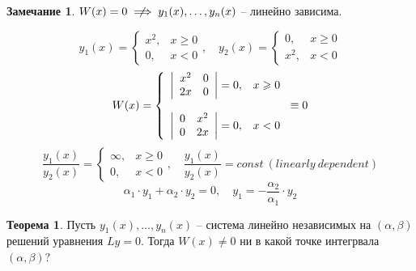 \documentclass{report}
\theoremstyle{definition}
\newtheorem*{remark}{Замечание}
\newtheorem{theorem}{Теорема}[section]
\begin{document}
\begin{remark}
    $W(x) = 0 \centernot\implies y_1(x),\ldots,y_n(x)$ -- линейно зависима.

    \begin{equation*}
        y_1(x) = \left\{\begin{array}{ll}
            x^2, & x \geqslant 0 \\
            0,   & x < 0
        \end{array}\right., \quad y_2(x) = \left\{\begin{array}{ll}
            0,   & x \geqslant 0 \\
            x^2, & x < 0
        \end{array}\right.
    \end{equation*}
    \begin{equation*}
        W(x) = \left\{\begin{array}{ll}
            \left|\begin{array}{cc}
                      x^2 & 0 \\
                      2x  & 0
                  \end{array}\right| = 0, & x \geqslant 0 \\
            \empty                                        \\
            \left|\begin{array}{cc}
                      0 & x^2 \\
                      0 & 2x
                  \end{array}\right| = 0, & x < 0
        \end{array}\right. \equiv 0
    \end{equation*}
    \begin{equation*}
        \frac{y_1(x)}{y_2(x)} = \left\{\begin{array}{ll}
            \infty, & x \geqslant 0 \\
            0, & x < 0
        \end{array}\right., \quad \frac{y_1(x)}{y_2(x)} = const \ (linearly \ dependent)
    \end{equation*}
    \begin{equation*}
        \alpha_1\cdot y_1 + \alpha_2 \cdot y_2 = 0, \quad y_1 = - \frac{\alpha_2}{\alpha_1} \cdot y_2
    \end{equation*}
\end{remark}

\begin{theorem}
    Пусть $y_1(x), \ldots, y_n(x)$ -- система линейно независимых на $(\alpha,\beta)$ решений уравнения $Ly = 0$. Тогда $W(x) \ne 0$ ни в какой точке интегрвала $(\alpha,\beta)$?
\end{theorem}
\end{document}
